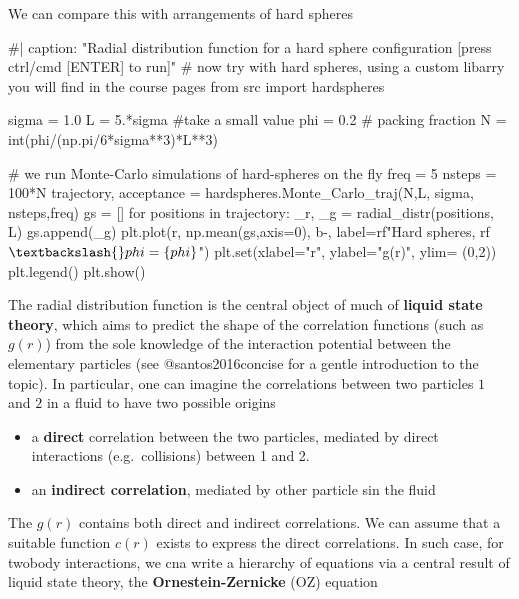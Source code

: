 \documentclass[
  letterpaper,
  enabledeprecatedfontcommands]{report}
\newenvironment{Shaded}{\begin{snugshade}}{\end{snugshade}}
\newcommand{\NormalTok}[1]{\textcolor[rgb]{0.00,0.23,0.31}{#1}}
\providecommand{\tightlist}{%
  \setlength{\itemsep}{0pt}\setlength{\parskip}{0pt}}
\begin{document}
We can compare this with arrangements of hard spheres

\begin{Shaded}
\begin{Highlighting}[]
\NormalTok{\#| caption: "Radial distribution function for a hard sphere configuration [press ctrl/cmd [ENTER] to run]"}
\NormalTok{\# now try with hard spheres, using a custom libarry you will find in the course pages}
\NormalTok{from src import hardspheres}

\NormalTok{sigma = 1.0}
\NormalTok{L = 5.*sigma \#take a small value}
\NormalTok{phi = 0.2 \# packing fraction}
\NormalTok{N = int(phi/(np.pi/6*sigma**3)*L**3)}

\NormalTok{\#  we run Monte{-}Carlo simulations of hard{-}spheres on the fly }
\NormalTok{freq = 5}
\NormalTok{nsteps = 100*N}
\NormalTok{trajectory, acceptance = hardspheres.Monte\_Carlo\_traj(N,L, sigma, nsteps,freq)}
\NormalTok{gs = []}
\NormalTok{for positions in trajectory:}
\NormalTok{    \_r, \_g = radial\_distr(positions, L)}
\NormalTok{    gs.append(\_g)}
\NormalTok{plt.plot(r, np.mean(gs,axis=0), \textquotesingle{}b{-}\textquotesingle{}, label=rf"Hard spheres, rf$\textbackslash{}phi=\{phi\}$")}
\NormalTok{plt.set(xlabel="r", ylabel="g(r)", ylim= (0,2))}
\NormalTok{plt.legend()}
\NormalTok{plt.show()}
\end{Highlighting}
\end{Shaded}

The radial distribution function is the central object of much of
\textbf{liquid state theory}, which aims to predict the shape of the
correlation functions (such as \(g(r)\)) from the sole knowledge of the
interaction potential between the elementary particles (see
@santos2016concise for a gentle introduction to the topic). In
particular, one can imagine the correlations between two particles \(1\)
and \(2\) in a fluid to have two possible origins

\begin{itemize}
\tightlist
\item
  a \textbf{direct} correlation between the two particles, mediated by
  direct interactions (e.g.~collisions) between 1 and 2.
\item
  an \textbf{indirect correlation}, mediated by other particle sin the
  fluid
\end{itemize}

The \(g(r)\) contains both direct and indirect correlations. We can
assume that a suitable function \(c(r)\) exists to express the direct
correlations. In such case, for twobody interactions, we cna write a
hierarchy of equations via a central result of liquid state theory, the
\textbf{Ornestein-Zernicke} (OZ) equation
\end{document}
